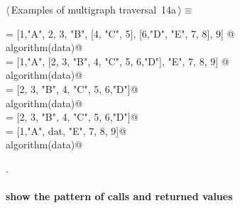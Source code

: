 \documentclass[11pt,oneside]{article}	%
\begin{document}
\begin{flushleft} \small \label{scrap28}
\protect{}$\langle\,$Examples of multigraph traversal\nobreak\ {\footnotesize 14a}$\,\rangle\equiv$
\vspace{-1ex}
\begin{list}{}{} \item
\mbox{}\verb@data = [1,"A", 2, 3, "B", [4, "C", 5], [6,"D", "E", 7, 8], 9]  @\\
\mbox{}\verb@print algorithm(data)@\\
\mbox{}\verb@data = [1,"A", [2, 3, "B", 4, "C", 5, 6,"D"], "E", 7, 8, 9]  @\\
\mbox{}\verb@print algorithm(data)@\\
\mbox{}\verb@data = [2, 3, "B", 4, "C", 5, 6,"D"]@\\
\mbox{}\verb@print algorithm(data)@\\
\mbox{}\verb@dat = [2, 3, "B", 4, "C", 5, 6,"D"]@\\
\mbox{}\verb@data = [1,"A", dat, "E", 7, 8, 9]@\\
\mbox{}\verb@print algorithm(data)@\\
\mbox{}\verb@@{\NWsep}
\end{list}
\vspace{-1ex}
\footnotesize\addtolength{\baselineskip}{-1ex}
\begin{list}{}{\setlength{\itemsep}{-\parsep}\setlength{\itemindent}{-\leftmargin}}
\item {\NWtxtMacroNoRef}.
\end{list}
\end{flushleft}


\paragraph{show the pattern of calls and returned values}
\end{document}
